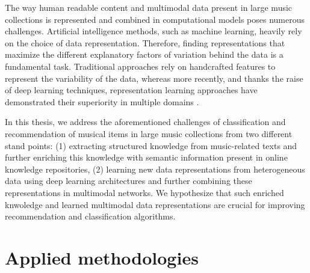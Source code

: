 The way human readable content and multimodal data present in large music collections is represented and combined in computational models poses numerous challenges. Artificial intelligence methods, such as machine learning, heavily rely on the choice of data representation. Therefore, finding representations that maximize the different explanatory factors of variation behind the data is a fundamental task. Traditional approaches rely on handcrafted features to represent the variability of the data, whereas more recently, and thanks the raise of deep learning techniques, representation learning approaches have demonstrated their superiority in multiple domains \citep{bengio2013representation}.

In this thesis, we address the aforementioned challenges of classification and recommendation of musical items in large music collections from two different stand points: (1) extracting structured knowledge from music-related texts and further enriching this knowledge with semantic information present in online knowledge repositories, (2) learning new data representations from heterogeneous data using deep learning architectures and further combining these representations in multimodal networks. %
We hypothesize that such enriched knwoledge and learned multimodal data representations are crucial for improving recommendation and classification algorithms. %

\section{Applied methodologies}

